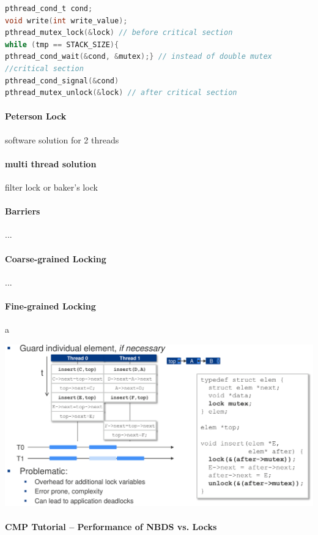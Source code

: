 \documentclass[fontsize=8pt]{scrartcl}
\begin{document}
\begin{multicols*}{4}
\begin{lstlisting}[language=c, numbers=none]
pthread_cond_t cond;
void write(int write_value);
pthread_mutex_lock(&lock) // before critical section
while (tmp == STACK_SIZE){
pthread_cond_wait(&cond, &mutex);} // instead of double mutex
//critical section
pthread_cond_signal(&cond)
pthread_mutex_unlock(&lock) // after critical section
\end{lstlisting} %

\paragraph{Peterson Lock} software solution for 2 threads

\paragraph{multi thread solution} filter lock or baker's lock 

\paragraph{Barriers}...

\paragraph{Coarse-grained Locking} ...

\paragraph{Fine-grained Locking} a

\begin{center}
  \centering
  \includegraphics[width=0.8\linewidth]{img/fineGrainedLock.png}
  \label{fig:finegrainedlock}
\end{center}

\paragraph{CMP Tutorial – Performance of NBDS vs. Locks}


\end{multicols*}
\end{document}
